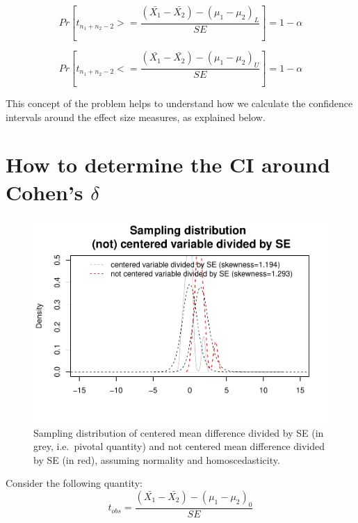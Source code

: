 \documentclass[man,floatsintext]{apa6}
\begin{document}
\begin{equation} 
Pr[t_{n_1+n_2-2} >= \frac{(\bar{X_1}-\bar{X_2})-(\mu_1-\mu_2)_L}{SE}]= 1- \alpha
\label{eq:plausiblelimit1}
\end{equation}

\begin{equation} 
Pr[t_{n_1+n_2-2} <= \frac{(\bar{X_1}-\bar{X_2})-(\mu_1-\mu_2)_U}{SE}]= 1- \alpha
\label{eq:plausiblelimit2}
\end{equation}

This concept of the problem helps to understand how we calculate the confidence intervals around the effect size measures, as explained below.

\hypertarget{how-to-determine-the-ci-around-cohens-delta}{%
\section{\texorpdfstring{How to determine the CI around Cohen's \(\delta\)}{How to determine the CI around Cohen's \textbackslash delta}}\label{how-to-determine-the-ci-around-cohens-delta}}

\begin{figure}
\centering
\includegraphics{CI-Reminder_files/figure-latex/SAMPLMEANDIFF3-1.pdf}
\caption{\label{fig:SAMPLMEANDIFF3}Sampling distribution of centered mean difference divided by SE (in grey, i.e.~pivotal quantity) and not centered mean difference divided by SE (in red), assuming normality and homoscedasticity.}
\end{figure}

Consider the following quantity:
\begin{equation} 
t_{obs}=\frac{(\bar{X_1}-\bar{X_2})-(\mu_1-\mu_2)_0}{SE}
\label{eq:plausiblelimit2}
\end{equation}
\end{document}
